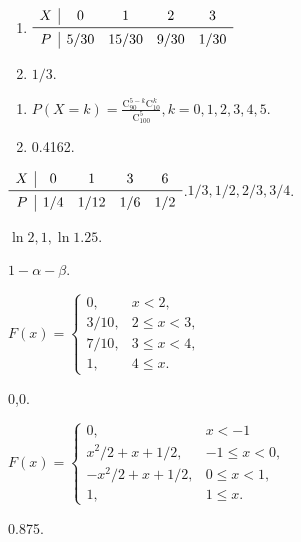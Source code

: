 \begin{answer}
  \item \begin{enumerate}
    \item $\begin{array}{c|cccc}
      X & 0 & 1 & 2 & 3 \\
      \midrule
      P & 5/30 & 15/30 & 9/30 & 1/30
    \end{array}$
    \item $1/3$.
  \end{enumerate}

  \item \begin{enumerate}
    \item $P(X=k)=\frac{\mathrm C_{90}^{5-k}\mathrm C_{10}^k}{\mathrm C_{100}^5},k=0,1,2,3,4,5$.
    \item 0.4162.
  \end{enumerate}

  \item $\begin{array}{c|cccc}
    X & 0 & 1 & 3 & 6 \\
    \midrule
    P & 1/4 & 1/12 & 1/6 & 1/2
  \end{array}$.\quad $1/3,1/2,2/3,3/4$.

  \item $\ln2,1,\ln1.25$.

  \item $1-\alpha-\beta$.

  \item \begin{enumerate*}
    \item $F(x)=\begin{cases}
      0, & x<2, \\
      3/10, & 2\le x<3, \\
      7/10, & 3\le x <4, \\
      1, & 4\le x.
    \end{cases}$
    \item 0,0.
  \end{enumerate*}

  \item $F(x)=\begin{cases}
    0, & x<-1 \\
    x^2/2+x+1/2, & -1\le x<0, \\
    -x^2/2+x+1/2, & 0\le x<1, \\
    1, & 1\le x.
  \end{cases}$

  \item 0.875.


\end{answer}
